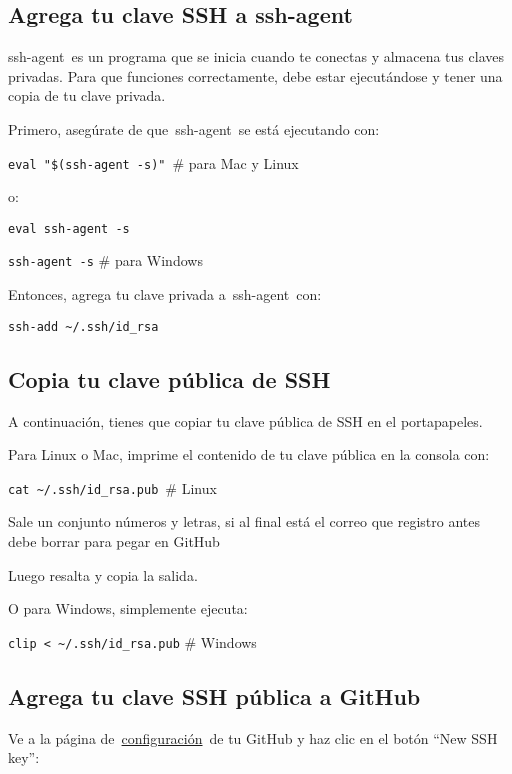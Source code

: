 \documentclass[
  a2paper,
]{article}
\begin{document}
\hypertarget{agrega-tu-clave-ssh-a-ssh-agent}{%
\subsection{Agrega tu clave SSH a
ssh-agent}\label{agrega-tu-clave-ssh-a-ssh-agent}}

ssh-agent~es un programa que se inicia cuando te conectas y almacena tus
claves privadas. Para que funciones correctamente, debe estar
ejecutándose y tener una copia de tu clave privada.

Primero, asegúrate de que~ssh-agent~se está ejecutando con:

\texttt{eval\ "\$(ssh-agent\ -s)"}~\# para Mac y Linux

o:

\texttt{eval\ ssh-agent\ -s}

\texttt{ssh-agent\ -s} \# para Windows

Entonces, agrega tu clave privada a~ssh-agent~con:

\texttt{ssh-add\ \textasciitilde{}/.ssh/id\_rsa}

\hypertarget{copia-tu-clave-puxfablica-de-ssh}{%
\subsection{Copia tu clave pública de
SSH}\label{copia-tu-clave-puxfablica-de-ssh}}

A continuación, tienes que copiar tu clave pública de SSH en el
portapapeles.

Para Linux o Mac, imprime el contenido de tu clave pública en la consola
con:

\texttt{cat\ \textasciitilde{}/.ssh/id\_rsa.pub}~\# Linux

Sale un conjunto números y letras, si al final está el correo que
registro antes debe borrar para pegar en GitHub

Luego resalta y copia la salida.

O para Windows, simplemente ejecuta:

\texttt{clip\ \textless{}\ \textasciitilde{}/.ssh/id\_rsa.pub} \#
Windows

\hypertarget{agrega-tu-clave-ssh-puxfablica-a-github}{%
\subsection{Agrega tu clave SSH pública a
GitHub}\label{agrega-tu-clave-ssh-puxfablica-a-github}}

Ve a la página
de~\href{https://github.com/settings/keys}{configuración}~de tu GitHub y
haz clic en el botón ``New SSH key'':
\end{document}
